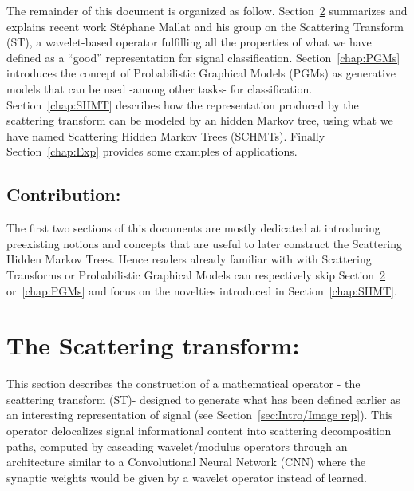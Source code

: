 \documentclass[a4paper,11pt]{report}
\begin{document}
    The remainder of this document is organized as follow. Section~\ref{chap:ST} summarizes and explains recent work St\'ephane Mallat and his group on the Scattering Transform (ST), a wavelet-based operator fulfilling all the properties of what we have defined as a ``good'' representation for signal classification. Section~\ref{chap:PGMs} introduces the concept of Probabilistic Graphical Models (PGMs) as generative models that can be used -among other tasks- for classification. Section~\ref{chap:SHMT} describes how the representation produced by the scattering transform can be modeled by an hidden Markov tree, using what we have named Scattering Hidden Markov Trees (SCHMTs). Finally Section~\ref{chap:Exp} provides some examples of applications.
    
	\section{Contribution:}
    \label{sec:Intro/Contrib}    
    
    The first two sections of this documents are mostly dedicated at introducing preexisting notions and concepts that are useful to later construct the Scattering Hidden Markov Trees. Hence readers already familiar with with Scattering Transforms or Probabilistic Graphical Models can respectively skip Section~\ref{chap:ST} or~\ref{chap:PGMs} and focus on the novelties introduced in Section~\ref{chap:SHMT}.

    
\chapter{The Scattering transform:}
  \label{chap:ST}
 
	This section describes the construction of a mathematical operator - the scattering transform (ST)- designed to generate what has been defined earlier as an interesting representation of signal (see Section~\ref{sec:Intro/Image rep}). This operator delocalizes signal informational content into scattering decomposition paths, computed by cascading wavelet/modulus operators through an architecture similar to a Convolutional Neural Network (CNN) where the synaptic weights would be given by a wavelet operator instead of learned.\\ 
	
\end{document}
